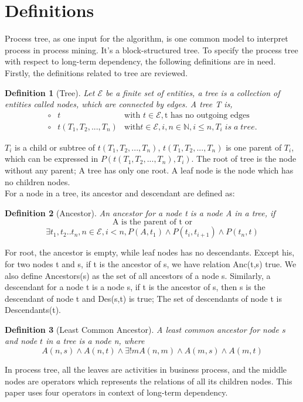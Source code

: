 \documentclass[]{article}
\newtheorem{mydef}{Definition}[section]
\begin{document}
\section{Definitions}
Process tree, as one input for the algorithm, is one common model to interpret process in process mining. It's a block-structured tree. To specify the process tree with respect to long-term dependency, the following definitions are in need. Firstly, the definitions related to tree are reviewed.
\begin{mydef}[Tree]
	Let $ \mathscr{E} $ be a finite set of entities, a tree is a collection of entities called nodes, which are connected by edges. A tree T is,
	\[
	\begin{array}{ rll}
		\circ&t & \mbox{with } t\in \mathscr{E},  \text{t has no outgoing edges}\\
		\circ&t(T_1,T_2,...,T_n) & \mbox{with} t\in \mathscr{E}, i,n\in \mathbb{N}, i \leq n ,T_i\;is\; a\; tree.
	\end{array}
	\]
\end{mydef}
$T_i$ is a child or subtree of $t(T_1,T_2,...,T_n)$, $t(T_1,T_2,...,T_n)$ is one parent of $T_i$, which can be expressed in $P(t(T_1,T_2,...,T_n),T_i)$. The root of tree is the node without any parent; A tree has only one root. A leaf node is the node which has no children nodes.\\
For a node in a tree, its ancestor and descendant are defined as:
\begin{mydef}[Ancestor]
	An ancestor for a node t is a node A in a tree, if 
	\[\text{A is the parent of t or} \]
	\[ \exists t_1,t_2..t_n,n\in \mathscr{E}, i < n, P(A,t_1)\land P(t_i,t_{i+1}) \land P(t_n,t) \]
\end{mydef}
For root, the ancestor is empty, while leaf nodes has no descendants. Except his, for two nodes t and s, if t is the ancestor of s, we have relation Anc(t,s) true. We also define Ancestors(s) as the set of all ancestors of a node s. Similarly, a descendant for a node t is a node s, if t is the ancestor of s, then s is the descendant of node t and Des(s,t) is true; The set of descendants of node t is Descendants(t).
\begin{mydef}[Least Common Ancestor]
	A least common ancestor for node $s$ and node $t$ in a tree is a node n, where 
	\[A(n,s) \land A(n,t) \land \exists! m A(n,m) \land A(m,s) \land A(m,t) \]
\end{mydef}
In process tree, all the leaves are activities in business process, and the middle nodes are operators which represents the relations of all its children nodes\cite{vanderAalst:2016:PMD:2948762,leemans2013discovering}. This paper uses four operators in context of long-term dependency.
\end{document}
